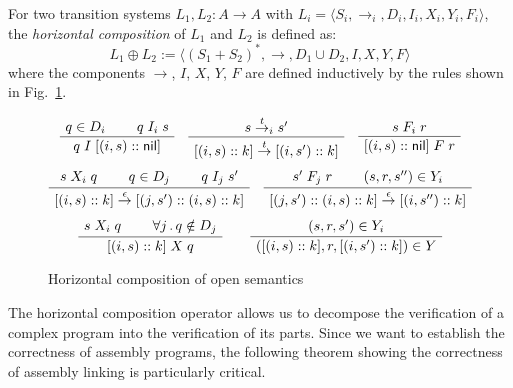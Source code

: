 \documentclass[sigplan,10pt,review,anonymous]{acmart}
\newcommand{\kw}[1]{\ensuremath{ \mathsf{#1} }}
\begin{document}
\begin{definition} \label{def:hcomp} %
For two transition systems $L_1, L_2 : A \rightarrow A$
with
$L_i = \langle S_i, {\rightarrow}_i, D_i, I_i, X_i, Y_i, F_i \rangle$,
the \emph{horizontal composition} of $L_1$ and $L_2$
is defined as:
\[
    L_1 \oplus L_2 :=
    \langle
      (S_1 + S_2)^*, {\rightarrow}, D_1 \cup D_2, I, X, Y, F
    \rangle
\]
where the components $\rightarrow$, $I$, $X$, $Y$, $F$
are defined inductively by
the rules shown in Fig.~\ref{fig:hcomp}.
\end{definition}

\begin{figure} %
    \footnotesize
    \begin{gather*}
        \AxiomC{$q \in D_i$}
        \AxiomC{$q \mathrel{I_i} s$}
        \BinaryInfC{$q \mathrel{I} [(i, s) :: \kw{nil}]$}
        \DisplayProof
        \quad
        \AxiomC{$s \stackrel{t}{\rightarrow}_i s'$}
        \UnaryInfC{$
            [(i, s) :: k]
            \stackrel{t}{\rightarrow}
            [(i, s') :: k]$}
        \DisplayProof
        \quad
        \AxiomC{$s \mathrel{F_i} r$}
        \UnaryInfC{$[(i, s) :: \kw{nil}] \mathrel{F} r$}
        \DisplayProof
        \\[1ex]
        \AxiomC{$s \mathrel{X_i} q$}
        \AxiomC{$q \in D_j$}
        \AxiomC{$q \mathrel{I_j} s'$}
        \TrinaryInfC{$
            [(i, s) :: k]
            \stackrel{\epsilon}{\rightarrow}
            [(j, s') :: (i, s) :: k]$}
        \DisplayProof
        \quad
        \AxiomC{$s' \mathrel{F_j} r$}
        \AxiomC{$(s, r, s'') \in Y_i$}
        \BinaryInfC{$
            [(j, s') :: (i, s) :: k]
            \stackrel{\epsilon}{\rightarrow}
            [(i, s'') :: k]$}
        \DisplayProof
        \\[1ex]
        \AxiomC{$s \mathrel{X_i} q$}
        \AxiomC{$\forall j \,.\, q \notin D_j$}
        \BinaryInfC{$[(i, s) :: k] \mathrel{X} q$}
        \DisplayProof
        \qquad
        \AxiomC{$(s, r, s') \in Y_i$}
        \UnaryInfC{$([(i, s) :: k], r, [(i, s') :: k]) \in Y$}
        \DisplayProof
    \end{gather*}
    \caption{Horizontal composition of open semantics}
    \label{fig:hcomp}
\end{figure}

The horizontal composition operator
allows us to decompose the verification of a complex program
into the verification of its parts.
Since we want to
establish the correctness of assembly programs,
the following theorem showing the correctness
of assembly linking is particularly critical.
\end{document}
